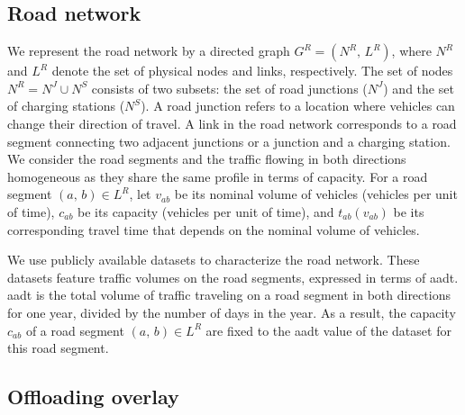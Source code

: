\subsection{Road network}
\label{sec:road-network-characterization}

We represent the road network by a directed graph $G^R=(N^R,\,L^R)$, where $N^R$ and $L^R$ denote the set of physical nodes and links, respectively. The set of nodes $N^R=N^J\cup N^S$ consists of two subsets: the set of road junctions ($N^J$) and the set of charging stations ($N^S$). A road junction refers to a location where vehicles can change their direction of travel. A link in the road network corresponds to a road segment connecting two adjacent junctions or a junction and a charging station. We consider the road segments and the traffic flowing in both directions homogeneous as they share the same profile in terms of capacity. For a road segment $(a,\,b)\in L^{R}$, let $v_{ab}$ be its nominal volume of vehicles (vehicles per unit of time), $c_{ab}$ be its capacity (vehicles per unit of time), and $t_{ab}(v_{ab})$ be its corresponding travel time that depends on the nominal volume of vehicles. 

We use publicly available datasets to characterize the road network. These datasets feature traffic volumes on the road segments, expressed in terms of \acrfull{aadt}. \Acrshort{aadt} is the total volume of traffic traveling on a road segment in both directions for one year, divided by the number of days in the year. As a result, the capacity $c_{ab}$ of a road segment $(a,\,b)\in L^{R}$ are fixed to the \acrshort{aadt} value of the dataset for this road segment.


\subsection{Offloading overlay}
\label{sec:offloading-overlay-characterization}

